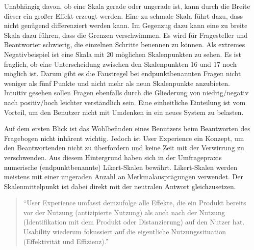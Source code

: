 Unabhängig davon, ob eine Skala gerade oder ungerade ist, kann durch die Breite dieser ein großer Effekt erzeugt werden. 
Eine zu schmale Skala führt dazu, dass nicht genügend differenziert werden kann.
Im Gegenzug dazu kann eine zu breite Skala dazu führen, dass die Grenzen verschwimmen.
Es wird für Fragesteller und Beantworter schwierig, die einzelnen Schritte benennen zu können. 
Als extremes Negativbeispiel ist eine Skala mit 20 möglichen Skalenpunkten zu sehen.
Es ist fraglich, ob eine Unterscheidung zwischen den Skalenpunkten 16 und 17 noch möglich ist.
Darum gibt es die Faustregel bei endpunktbenannten Fragen nicht weniger als fünf Punkte und nicht mehr als neun Skalenpunkte anzubieten\autocite[S.87]{2014Fragebogen}. %
Intuitiv gesehen sollen Fragen ebenfalls durch die Gliederung von niedrig/negativ nach positiv/hoch leichter verständlich sein. Eine einheitliche Einteilung ist vom Vorteil, um den Benutzer nicht mit Umdenken in ein neues System zu belasten\autocite[S.89/90]{2014Fragebogen}. %

Auf dem ersten Blick ist das Wohlbefinden eines Benutzers beim Beantworten des Fragebogen nicht inhärent wichtig. 
Jedoch ist User Experience ein Konzept, um den Beantwortenden nicht zu überfordern und keine Zeit mit der Verwirrung zu verschwenden.
Aus diesem Hintergrund haben sich in der Umfragepraxis numerische (endpunktbenannte) Likert-Skalen bewährt\autocite{Likert}. %
Likert-Skalen werden meistens mit einer ungeraden Anzahl an Merkmalausprägungen verwendet. Der Skalenmittelpunkt ist dabei direkt mit der neutralen Antwort gleichzusetzen\autocite{ISO}. \label{Likert} 

\begin{quote}
	\enquote{User Experience umfasst demzufolge alle Effekte, die ein Produkt bereits vor der Nutzung (antizipierte Nutzung) als auch nach der Nutzung (Identifikation mit dem Produkt oder Distanzierung) auf den Nutzer hat. Usability wiederum fokussiert auf die eigentliche Nutzungssituation (Effektivität und Effizienz).}\autocite{User}%
\end{quote}

